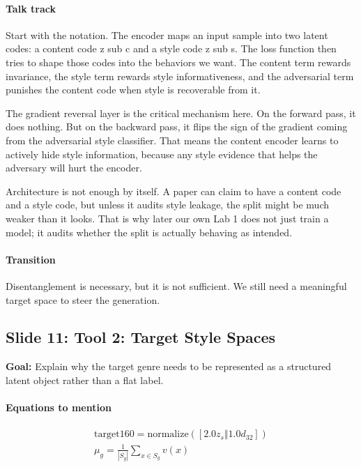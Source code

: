 \documentclass[11pt]{article}
\begin{document}
\paragraph{Talk track}
Start with the notation. The encoder maps an input sample into two latent codes: a content code z sub c and a style code z sub s. The loss function then tries to shape those codes into the behaviors we want. The content term rewards invariance, the style term rewards style informativeness, and the adversarial term punishes the content code when style is recoverable from it.

The gradient reversal layer is the critical mechanism here. On the forward pass, it does nothing. But on the backward pass, it flips the sign of the gradient coming from the adversarial style classifier. That means the content encoder learns to actively hide style information, because any style evidence that helps the adversary will hurt the encoder.

Architecture is not enough by itself. A paper can claim to have a content code and a style code, but unless it audits style leakage, the split might be much weaker than it looks. That is why later our own Lab 1 does not just train a model; it audits whether the split is actually behaving as intended.

\paragraph{Transition}
Disentanglement is necessary, but it is not sufficient. We still need a meaningful target space to steer the generation.

\subsection*{Slide 11: Tool 2: Target Style Spaces}
\textbf{Goal:} Explain why the target genre needs to be represented as a structured latent object rather than a flat label.
\paragraph{Equations to mention}
\begin{align*}
\mathrm{target160}=\mathrm{normalize}([2.0 z_s \Vert 1.0 d_{32}])\\
\mu_g=\frac{1}{|S_g|}\sum_{x\in S_g} v(x)
\end{align*}
\end{document}
